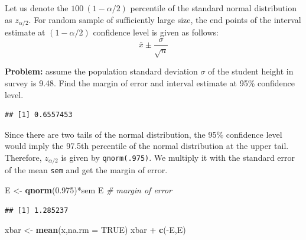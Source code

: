 \documentclass[]{article}
\newenvironment{Shaded}{\begin{snugshade}}{\end{snugshade}}
\newcommand{\KeywordTok}[1]{\textcolor[rgb]{0.13,0.29,0.53}{\textbf{{#1}}}}
\newcommand{\DataTypeTok}[1]{\textcolor[rgb]{0.13,0.29,0.53}{{#1}}}
\newcommand{\FloatTok}[1]{\textcolor[rgb]{0.00,0.00,0.81}{{#1}}}
\newcommand{\StringTok}[1]{\textcolor[rgb]{0.31,0.60,0.02}{{#1}}}
\newcommand{\CommentTok}[1]{\textcolor[rgb]{0.56,0.35,0.01}{\textit{{#1}}}}
\newcommand{\OtherTok}[1]{\textcolor[rgb]{0.56,0.35,0.01}{{#1}}}
\newcommand{\NormalTok}[1]{{#1}}
\numberwithin{equation}{section}
\begin{document}
Let us denote the \(100~(1-\alpha/2)\) percentile of the standard normal
distribution as \(z_{\alpha/2}\). For random sample of sufficiently
large size, the end points of the interval estimate at \((1-\alpha/2)\)
confidence level is given as follows: \[
  \bar{x} \pm \frac{\sigma}{\sqrt{n}}
\]

\textbf{Problem:} assume the population standard deviation \(\sigma\) of
the student height in survey is 9.48. Find the margin of error and
interval estimate at 95\% confidence level.

\begin{Shaded}
\end{Shaded}

\begin{verbatim}
## [1] 0.6557453
\end{verbatim}

Since there are two tails of the normal distribution, the 95\%
confidence level would imply the 97.5th percentile of the normal
distribution at the upper tail. Therefore, \(z_{\alpha/2}\) is given by
\texttt{qnorm(.975)}. We multiply it with the standard error of the mean
\texttt{sem} and get the margin of error.

\begin{Shaded}
\begin{Highlighting}[]
\NormalTok{E <-}\StringTok{ }\KeywordTok{qnorm}\NormalTok{(}\FloatTok{0.975}\NormalTok{)*sem }
\NormalTok{E  }\CommentTok{# margin of error}
\end{Highlighting}
\end{Shaded}

\begin{verbatim}
## [1] 1.285237
\end{verbatim}

\begin{Shaded}
\begin{Highlighting}[]
\NormalTok{xbar <-}\StringTok{ }\KeywordTok{mean}\NormalTok{(x,}\DataTypeTok{na.rm =} \OtherTok{TRUE}\NormalTok{)}
\NormalTok{xbar +}\StringTok{ }\KeywordTok{c}\NormalTok{(-E,E)}
\end{Highlighting}
\end{Shaded}
\end{document}
